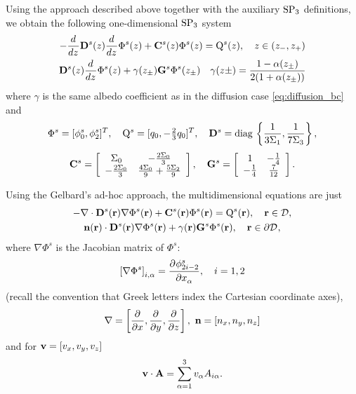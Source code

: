 Using the approach described above together with the auxiliary $\SPN[3]$ definitions, we obtain the following
one-dimensional $\SPN[3]$ system
\begin{equation}\label{eq:sp3_1d}
\begin{gathered}
	-\der{}{z} \mathbf D^s(z) \der{}{z} \Phi^s(z) + \mathbf{C}^s(z) \Phi^s(z) = \mathrm{Q}^s(z), \quad z \in
	(z_{-},z_{+})\\
	\mat{D}^s(z) \der{}{z} \Phi^s(z) + \gamma(z_{\pm}) \mat{G}^s \Phi^s(z_{\pm})
	\quad
	\gamma(z\pm) =
	\frac{1-\alpha(z_{\pm})}{2(1+\alpha(z_{\pm}))}
\end{gathered}
\end{equation}
where $\gamma$ is the same albedo coefficient as in the diffusion case \eqref{eq:diffusion_bc} and
\begin{equation}\label{eq:SP3_mat}
\begin{gathered}
	\Phi^s = [\phi^s_0, \phi^s_2]^T,\quad \mathrm{Q}^s = [q_0, -\tfrac{2}{3} q_0]^T, \quad 
	\mat{D}^s = \diag \left\{\frac{1}{3\Sigma_1}, \frac{1}{7\Sigma_3}\right\},\\[.3em]
	\mat{C}^s = \left[
\begin{array}{cc}
 \Sigma _0 & -\frac{2 \Sigma _0}{3} \\
 -\frac{2 \Sigma _0}{3}  & \frac{4 \Sigma _0}{9}+\frac{5 \Sigma _2}{9}
\end{array}
\right],\quad 
\mat{G}^s = \left[
\begin{array}{cc}
 1 & -\frac{1}{4} \\
 -\frac{1}{4} & \frac{7}{12} \\
\end{array}
\right].
\end{gathered}
\end{equation}

Using the Gelbard's ad-hoc approach, the multidimensional equations are just
\begin{equation}\label{eq:sp3}
\begin{gathered}
	-\nabla\cdot \mat{D}^s(\br) \nabla \Phi^s(\br) + \mat{C}^s(\br) \Phi^s(\br) = \mathrm{Q}^s(\br), \quad \br \in
	\VV,\\
	\bn(\br)\cdot\mat{D}^s(\br) \nabla \Phi^s(\br) + \gamma(\br) \mathbf{G}^s \Phi^s(\br), \quad \br\in\pV,
\end{gathered}
\end{equation}
where $\nabla\Phi^s$ is the Jacobian matrix of $\Phi^s$:
$$
	\left[\nabla\Phi^s\right]_{i,\alpha} = \pd{\phi^s_{2i-2}}{x_\alpha},\quad i = 1,2
$$
(recall the convention that Greek letters index the Cartesian coordinate axes), 
$$
	\nabla = \left[\pd{}{x}, \pd{}{y}, \pd{}{z}\right],\ \bn = [n_x, n_y, n_z]
$$
and for $\bv = [v_x, v_y, v_z]$
$$
	\bv \cdot \mat{A} = \sum_{\alpha=1}^3 v_\alpha A_{i\alpha}.
$$

